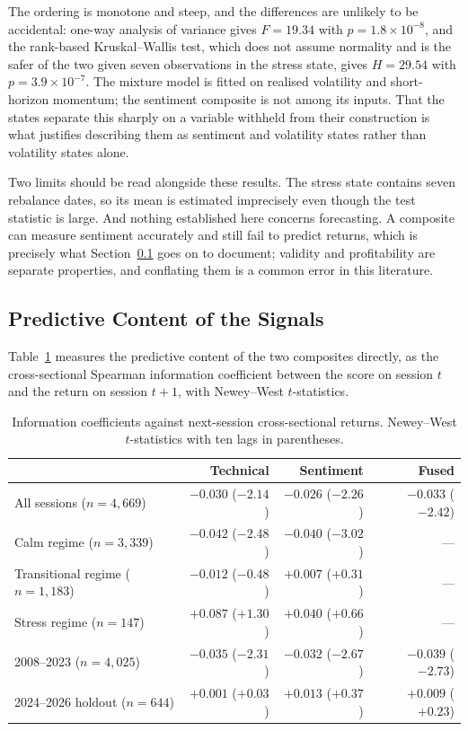 \documentclass{singlecol-new}
\theoremstyle{TH}{
\newtheorem{lemma}{Lemma}
\newtheorem{theorem}[lemma]{Theorem}
\newtheorem{corrolary}[lemma]{Corrolary}
\newtheorem{conjecture}[lemma]{Conjecture}
\newtheorem{proposition}[lemma]{Proposition}
\newtheorem{claim}[lemma]{Claim}
\newtheorem{stheorem}[lemma]{Wrong Theorem}
\newtheorem{algorithm}{Algorithm}
}
\theoremstyle{THrm}{
\newtheorem{definition}{Definition}[section]
\newtheorem{question}{Question}[section]
\newtheorem{remark}{Remark}
\newtheorem{scheme}{Scheme}
}
\theoremstyle{THhit}{
\newtheorem{case}{Case}[section]
}
\begin{document}
The ordering is monotone and steep, and the differences are unlikely to be accidental:
one-way analysis of variance gives $F = 19.34$ with $p = 1.8 \times 10^{-8}$, and the
rank-based Kruskal--Wallis test, which does not assume normality and is the safer of the
two given seven observations in the stress state, gives $H = 29.54$ with
$p = 3.9 \times 10^{-7}$. The mixture model is fitted on realised volatility and
short-horizon momentum; the sentiment composite is not among its inputs. That the states
separate this sharply on a variable withheld from their construction is what justifies
describing them as sentiment and volatility states rather than volatility states alone.

Two limits should be read alongside these results. The stress state contains seven
rebalance dates, so its mean is estimated imprecisely even though the test statistic is
large. And nothing established here concerns forecasting. A composite can measure
sentiment accurately and still fail to predict returns, which is precisely what
Section~\ref{sec:ic} goes on to document; validity and profitability are separate
properties, and conflating them is a common error in this literature.

\subsection{Predictive Content of the Signals}
\label{sec:ic}

Table~\ref{tab:ic} measures the predictive content of the two composites directly, as the
cross-sectional Spearman information coefficient between the score on session $t$ and
the return on session $t+1$, with Newey--West $t$-statistics.

\begin{table}[!ht]
\centering
\caption{Information coefficients against next-session cross-sectional returns.
Newey--West $t$-statistics with ten lags in parentheses.}
\label{tab:ic}
\small
\begin{tabular}{p{3.8cm}rrr}
\hline
& \textbf{Technical} & \textbf{Sentiment} & \textbf{Fused} \\
\hline
All sessions ($n=4{,}669$) & $-0.030$ ($-2.14$) & $-0.026$ ($-2.26$) & $-0.033$ ($-2.42$) \\
Calm regime ($n=3{,}339$) & $-0.042$ ($-2.48$) & $-0.040$ ($-3.02$) & --- \\
Transitional regime ($n=1{,}183$) & $-0.012$ ($-0.48$) & $+0.007$ ($+0.31$) & --- \\
Stress regime ($n=147$) & $+0.087$ ($+1.30$) & $+0.040$ ($+0.66$) & --- \\
\hline
2008--2023 ($n=4{,}025$) & $-0.035$ ($-2.31$) & $-0.032$ ($-2.67$) & $-0.039$ ($-2.73$) \\
2024--2026 holdout ($n=644$) & $+0.001$ ($+0.03$) & $+0.013$ ($+0.37$) & $+0.009$ ($+0.23$) \\
\hline
\end{tabular}
\end{table}
\end{document}
